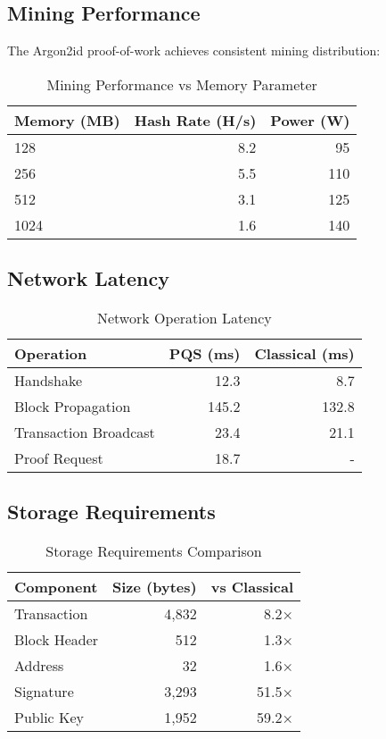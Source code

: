 \documentclass[12pt,a4paper]{article}
\begin{document}
\subsection{Mining Performance}

The Argon2id proof-of-work achieves consistent mining distribution:

\begin{table}[h]
\centering
\begin{tabular}{@{}lrr@{}}
\toprule
\textbf{Memory (MB)} & \textbf{Hash Rate (H/s)} & \textbf{Power (W)} \\ \midrule
128 & 8.2 & 95 \\
256 & 5.5 & 110 \\
512 & 3.1 & 125 \\
1024 & 1.6 & 140 \\
\bottomrule
\end{tabular}
\caption{Mining Performance vs Memory Parameter}
\end{table}

\subsection{Network Latency}

\begin{table}[h]
\centering
\begin{tabular}{@{}lrr@{}}
\toprule
\textbf{Operation} & \textbf{PQS (ms)} & \textbf{Classical (ms)} \\ \midrule
Handshake & 12.3 & 8.7 \\
Block Propagation & 145.2 & 132.8 \\
Transaction Broadcast & 23.4 & 21.1 \\
Proof Request & 18.7 & - \\
\bottomrule
\end{tabular}
\caption{Network Operation Latency}
\end{table}

\subsection{Storage Requirements}

\begin{table}[h]
\centering
\begin{tabular}{@{}lrr@{}}
\toprule
\textbf{Component} & \textbf{Size (bytes)} & \textbf{vs Classical} \\ \midrule
Transaction & 4,832 & 8.2× \\
Block Header & 512 & 1.3× \\
Address & 32 & 1.6× \\
Signature & 3,293 & 51.5× \\
Public Key & 1,952 & 59.2× \\
\bottomrule
\end{tabular}
\caption{Storage Requirements Comparison}
\end{table}
\end{document}
